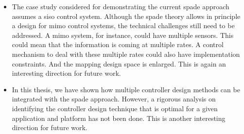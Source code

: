 \begin{itemize}
    \item The case study considered for demonstrating the current \gls{spade} approach assumes a \gls{siso} control system. Although the \gls{spade} theory allows in principle a design for \gls{mimo} control systems, the technical challenges still need to be addressed. A \gls{mimo} system, for instance, could have multiple sensors. This could mean that the information is coming at multiple rates. A control mechanism to deal with these multiple rates could also have implementation constraints. And the mapping design space is enlarged. This is again an interesting direction for future work.
    \item In this thesis, we have shown how multiple controller design methods can be integrated with the \gls{spade} approach.
    However, a rigorous analysis on identifying the controller design technique that is optimal for a given application and platform has not been done. This is another interesting direction for future work.
\end{itemize}